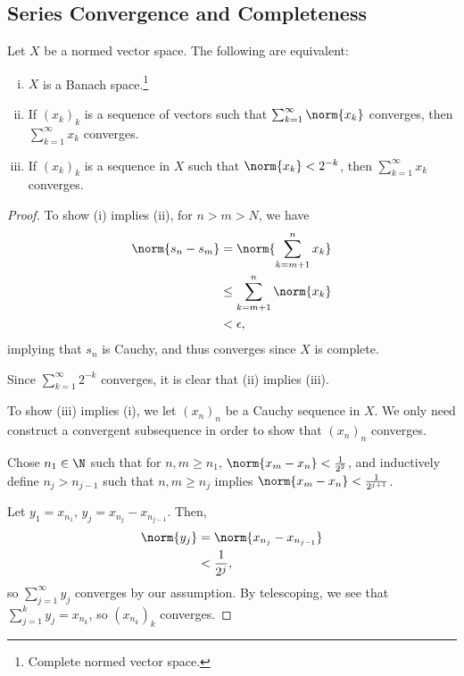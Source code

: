 \documentclass[10pt]{mypackage}
\begin{document}
\subsection{Series Convergence and Completeness}%
\begin{proposition}
Let $X$ be a normed vector space. The following are equivalent:
\begin{enumerate}[(i)]
  \item $X$ is a Banach space.\footnote{Complete normed vector space.}
  \item If $\left(x_k\right)_k$ is a sequence of vectors such that $\sum_{k=1}^{\infty}\norm{x_k}$ converges, then $\sum_{k=1}^{\infty}x_k$ converges.
  \item If $\left(x_k\right)_k$ is a sequence in $X$ such that $\norm{x_k} < 2^{-k}$, then $\sum_{k=1}^{\infty}x_k$ converges.
\end{enumerate}
\end{proposition}
\begin{proof}
  To show (i) implies (ii), for $n > m > N$, we have
  \begin{align*}
    \norm{s_n - s_m} &= \norm{\sum_{k=m+1}^{n}x_k}\\
                     &\leq \sum_{k=m+1}^{n}\norm{x_k}\\
                     &< \epsilon,
  \end{align*}
  implying that $s_n$ is Cauchy, and thus converges since $X$ is complete.\newline

  Since $\sum_{k=1}^{\infty}2^{-k}$ converges, it is clear that (ii) implies (iii).\newline

  To show (iii) implies (i), we let $\left(x_n\right)_n$ be a Cauchy sequence in $X$. We only need construct a convergent subsequence in order to show that $\left(x_n\right)_n$ converges.\newline

  Chose $n_1\in \N$ such that for $n,m\geq n_1$, $ \norm{x_m - x_n} < \frac{1}{2^2}$, and inductively define $n_j > n_{j-1}$ such that $n,m\geq n_j$ implies $\norm{x_m - x_n} < \frac{1}{2^{j+1}}$.\newline

  Let $y_1 = x_{n_1}$, $y_{j} = x_{n_j} - x_{n_{j-1}}$. Then,
  \begin{align*}
    \norm{y_j} &= \norm{x_{n_j} - x_{n_{j-1}}}\\
               &< \frac{1}{2^{j}},
  \end{align*}
  so $\sum_{j=1}^{\infty}y_j$ converges by our assumption. By telescoping, we see that $\sum_{j=1}^{k}y_j = x_{n_k}$, so $\left(x_{n_{k}}\right)_k$ converges.
\end{proof}
\end{document}
